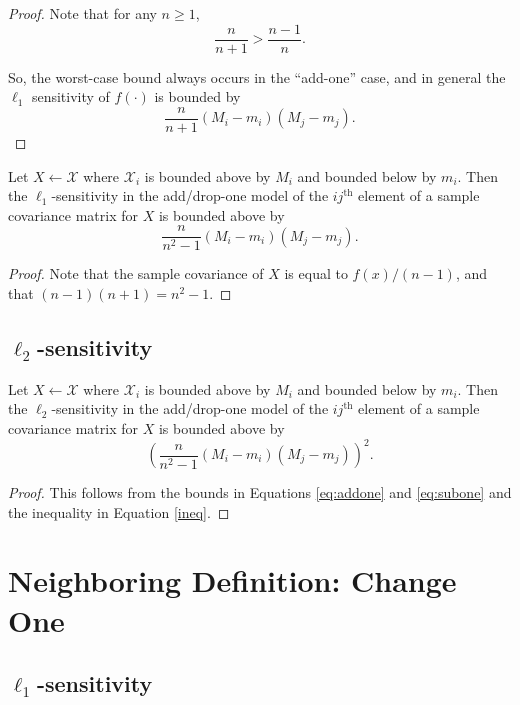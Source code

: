 \documentclass[11pt]{scrartcl} %
\begin{document}
\begin{proof}
Note that for any $n \ge 1$,
	\begin{equation}
	\label{ineq}
	 \frac{n}{n + 1} > \frac{n-1}{n}.
	\end{equation}

So, the worst-case bound always occurs in the ``add-one'' case, and in general the  $\ell_1$ sensitivity of $f(\cdot)$ is bounded by
 $$ \frac{n}{n+1}  (M_i - m_i)(M_j - m_j).$$ 
\end{proof}

\begin{corollary}
Let $X \leftarrow \mathcal{X}$ where $\mathcal{X}_i$ is bounded above by $M_i$ and bounded below by $m_i$. Then the $\ell_1$-sensitivity in the add/drop-one model of the $ij^{\text{th}}$ element of a sample covariance matrix for $X$ is bounded above by 
$$ \frac{n}{n^2-1}(M_i - m_i)(M_j - m_j).$$
\end{corollary}

\begin{proof}
Note that the sample covariance of $X$ is equal to $f(x)/(n-1)$, and that $(n-1)(n+1) = n^2 -1$.
\end{proof}

\subsection{$\ell_2$-sensitivity}

\begin{theorem}
Let $X \leftarrow \mathcal{X}$ where $\mathcal{X}_i$ is bounded above by $M_i$ and bounded below by $m_i$. Then the $\ell_2$-sensitivity in the add/drop-one model of the $ij^{\text{th}}$ element of a sample covariance matrix for $X$ is bounded above by
$$\left(\frac{n}{n^2-1}(M_i - m_i)(M_j - m_j)\right)^2.$$
\end{theorem}

\begin{proof}
This follows from the bounds in Equations \ref{eq:addone} and \ref{eq:subone} and the inequality in Equation \ref{ineq}.
\end{proof}

\section{Neighboring Definition: Change One}
\subsection{$\ell_1$-sensitivity}
\end{document}
